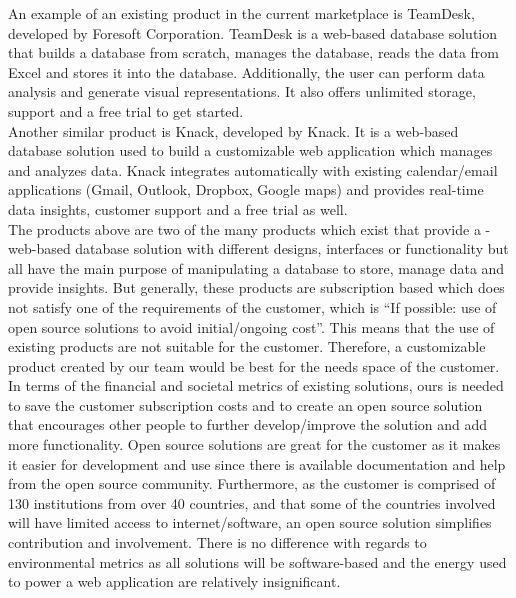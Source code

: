 \documentclass[11pt]{article}
\begin{document}
An example of an existing product in the current marketplace is TeamDesk, developed by Foresoft Corporation. \parencite{foresoft} TeamDesk is a web-based database solution that builds a database from scratch, manages the database, reads the data from Excel and stores it into the database. Additionally, the user can perform data analysis and generate visual representations. It also offers unlimited storage, support and a free trial to get started. \\

Another similar product is Knack, developed by Knack. \parencite{knack} It is a web-based database solution used to build a customizable web application which manages and analyzes data. Knack integrates automatically with existing calendar/email applications (Gmail, Outlook, Dropbox, Google maps) and provides real-time data insights, customer support and a free trial as well. \\

The products above are two of the many products which exist that provide a -web-based database solution with different designs, interfaces or functionality but all have the main purpose of manipulating a database to store, manage data and provide insights. But generally, these products are subscription based which does not satisfy one of the requirements of the customer, which is “If possible: use of open source solutions to avoid initial/ongoing cost”. This means that the use of existing products are not suitable for the customer. Therefore, a customizable product created by our team would be best for the needs space of the customer. \\

In terms of the financial and societal metrics of existing solutions, ours is needed to save the customer subscription costs and to create an open source solution that encourages other people to further develop/improve the solution and add more functionality. Open source solutions are great for the customer as it makes it easier for development and use since there is available documentation and help from the open source community. Furthermore, as the customer is comprised of 130 institutions from over 40 countries, and that some of the countries involved will have limited access to internet/software, an open source solution simplifies contribution and involvement. There is no difference with regards to environmental metrics as all solutions will be software-based and the energy used to power a web application are relatively insignificant. \\
\end{document}
